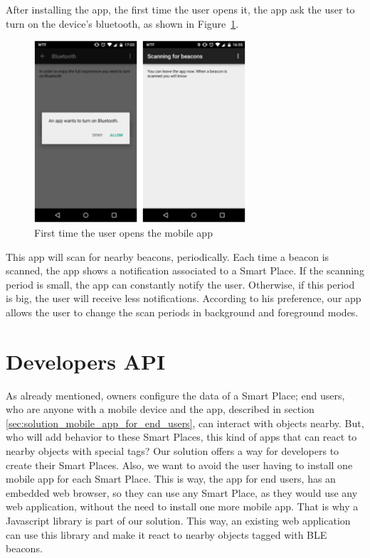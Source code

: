 After installing the app, the first time the user opens it, the app ask the user to turn on the device's bluetooth, as shown in Figure~\ref{fig:screenshot_clientapp_entry}.
\begin{figure}[!ht]
  \centering
    \includegraphics[width=0.7\textwidth, keepaspectratio]{images/screenshots/clientapp_entry}
    \caption[Users mobile app]{First time the user opens the mobile app}
    \label{fig:screenshot_clientapp_entry}
\end{figure}
This app will scan for nearby beacons, periodically.
Each time a beacon is scanned, the app shows a notification associated to a Smart Place.
If the scanning period is small, the app can constantly notify the user. Otherwise, if this period is big, the user will receive less notifications.
According to his preference, our app allows the user to change the scan periods in background and foreground modes.

\section{Developers API}
\label{sec:solution_developers_api}
As already mentioned, owners configure the data of a Smart Place; end users, who are anyone with a mobile device and the app, described in section \ref{sec:solution_mobile_app_for_end_users}, can interact with objects nearby.
But, who will add behavior to these Smart Places, this kind of apps that can react to nearby objects with special tags?
Our solution offers a way for developers to create their Smart Places.
Also, we want to avoid the user having to install one mobile app for each Smart Place.
This is way, the app for end users,
has an embedded web browser, so they can use any Smart Place, as they would use any web application, without the need to install one more mobile app.
That is why a Javascript library is part of our solution.
This way, an existing web application can use this library and make it react to nearby objects tagged with \gls{BLE} beacons.

